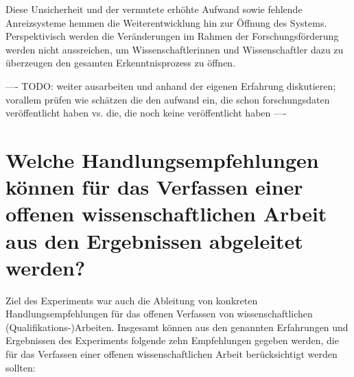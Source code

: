 Diese Unsicherheit und der vermutete erhöhte Aufwand sowie fehlende Anreizsysteme hemmen die Weiterentwicklung hin zur Öffnung des Systems. Perspektivisch werden die Veränderungen im Rahmen der Forschungsförderung werden nicht aussreichen, um Wissenschaftlerinnen und Wissenschaftler dazu zu überzeugen den gesamten Erkenntnisprozess zu öffnen.

---- TODO: weiter ausarbeiten und anhand der eigenen Erfahrung diskutieren; vorallem prüfen wie schätzen die den aufwand ein, die schon forschungsdaten veröffentlicht haben vs. die, die noch keine veröffentlicht haben ----

\section{Welche Handlungsempfehlungen können für das Verfassen einer offenen wissenschaftlichen Arbeit aus den Ergebnissen abgeleitet werden?}

Ziel des Experiments war auch die Ableitung von konkreten Handlungsempfehlungen für das offenen Verfassen von wissenschaftlichen (Qualifikations-)Arbeiten. Insgesamt können aus den genannten Erfahrungen und Ergebnissen des Experiments folgende zehn Empfehlungen gegeben werden, die für das Verfassen einer offenen wissenschaftlichen Arbeit berücksichtigt werden sollten:

